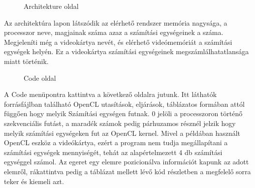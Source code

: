 \begin{figure}[h]
\centering
{}
\caption{Architekture oldal}
\label{fig:arch}
\end{figure}


Az architektúra lapon látszódik az elérhető rendszer memória nagysága, a processzor neve, magjainak száma azaz a számítási egységeinek a száma. Megjeleníti még a videokártya nevét, és elérhető videómemóriát a számítási egységek helyén. Ez a videokártya számítási egységeinek megszámlálhatatlansága miatt történik.

\begin{figure}[h]
\centering
{}
\caption{Code oldal}
\label{fig:code}
\end{figure}

\newpage
A Code menüpontra kattintva a következő oldalra jutunk. Itt láthatók forrásfájlban található OpenCL utasítások, eljárások, táblázatos formában attól függően hogy melyik Számítási egységen futnak. 0 jelöli a processzoron történő szekvenciális futást, a maradék számok pedig párhuzamos résznél jelzik hogy melyik számítási egységeken fut az OpenCL kernel. Mivel a példában használt OpenCL eszköz a videókártya, ezért a program nem tudja megállapítani a számítási egységek mennyiségét, tehát az alapértelmezett 4 db számítási egységgel számol. Az egeret egy elemre pozicionálva információt kapunk az adott elemről, rákattintva pedig a táblázat mellett lévő kód részletben a megfelelő sorra teker és kiemeli azt.


